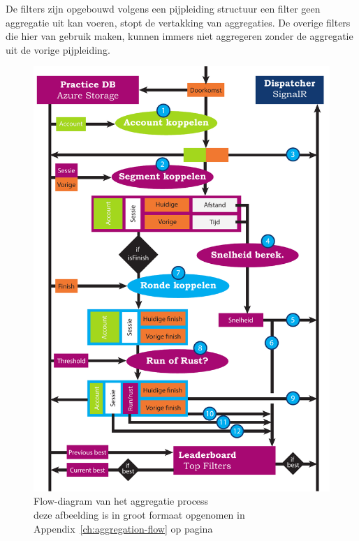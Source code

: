 De filters zijn opgebouwd volgens een pijpleiding structuur een filter geen aggregatie uit kan voeren, stopt de vertakking van aggregaties. De overige filters die hier van gebruik maken, kunnen immers niet aggregeren zonder de aggregatie uit de vorige pijpleiding.

\begin{figure}[h]
  \begin{center}
    \includegraphics[width=.4\textwidth]{style/images/Aggregatie-flow}
  \end{center}
  \caption{Flow-diagram van het aggregatie process \\ deze afbeelding is in groot formaat opgenomen in Appendix~\ref{ch:aggregation-flow} op pagina~\pageref{fig:aggregatie-flow-large}}
  \label{fig:aggregatie-flow}
\end{figure}

